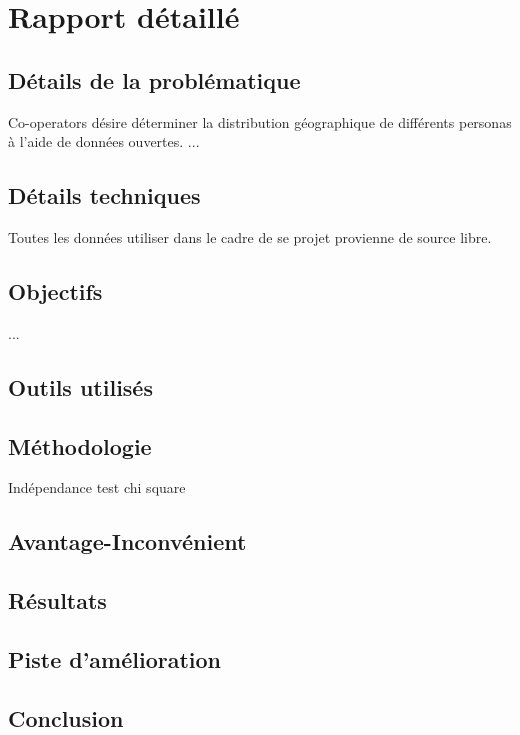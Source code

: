 \documentclass[11pt,french]{report}\usepackage[]{graphicx}\usepackage[]{color}
\begin{document}
\chapter*{Rapport détaillé}

\section*{Détails de la problématique}
Co-operators désire déterminer la distribution géographique de différents personas à l'aide de données ouvertes. 
...

\section*{Détails techniques}
Toutes les données utiliser dans le cadre de se projet provienne de source libre. 

\section*{Objectifs}
...

\section*{Outils utilisés}

\section*{Méthodologie}
Indépendance
test chi square

\section*{Avantage-Inconvénient}


\section*{Résultats}

\section*{Piste d'amélioration}

\section*{Conclusion}
\end{document}
